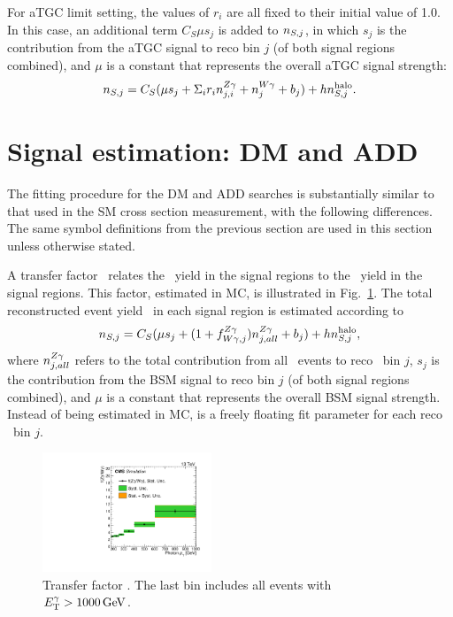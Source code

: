 For aTGC limit setting, the values of $r_{i}$ are all fixed to their initial value of 1.0.
In this case, an additional term $C_{S} \mu s_{j}$ is added to $\nS[,j]$,
in which $s_{j}$ is the contribution from the aTGC signal to reco bin $j$ (of both signal regions combined),
and $\mu$ is a constant that represents the overall aTGC signal strength:
\begin{equation}
  \nS[,j] = C_{S} (\mu s_{j} + \Sigma_{i}r_{i}\nZg[j,i] + \nWg[j] + b_{j}) + h\nhalo[,j].
\end{equation}

\section{Signal estimation: DM and ADD} \label{sec:signal_extraction_DM_ADD}
The fitting procedure for the DM and ADD searches is substantially similar to that used in the SM cross section measurement, with the following differences.
The same symbol definitions from the previous section are used in this section unless otherwise stated.

A transfer factor \fZW\ relates the \zinvg\ yield
in the signal regions to the \wlng\ yield in the signal regions. This factor, estimated in MC, is illustrated in Fig.~\ref{fig:tf_wz}.
The total reconstructed event yield \nS\ in each signal region is estimated according to
\begin{equation}
  \nS[,j] = C_{S} (\mu s_{j} + (1 + \fZW[,j])\nZg[j,all] + b_{j}) + h\nhalo[,j],
\end{equation}
where $\nZg[j,all]$ refers to the total contribution from all \zinvg\ events to reco \ETgamma\ bin $j$, $s_{j}$ is the contribution from the BSM
signal to reco bin $j$ (of both signal regions combined), and $\mu$ is a constant that represents the overall BSM signal strength.
Instead of being estimated in MC, \nZg[j,all] is a freely floating fit parameter for each reco \ETgamma\ bin $j$.

\begin{figure}[htbp]
  \begin{center}
    \includegraphics[width=0.45\textwidth]{figures/results/transfer_ZnnGinZnnG_over_WGinZnnG_phoPt.pdf}
    \caption{
      Transfer factor \fZW. The last bin includes all events with $\ETgamma > 1000\unit{GeV}$.
    }
    \label{fig:tf_wz}
  \end{center}
\end{figure}



